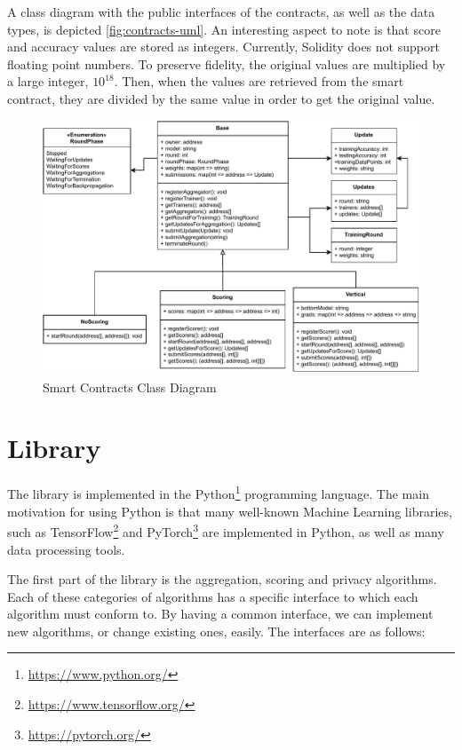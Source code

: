 A class diagram with the public interfaces of the contracts, as well as the data types, is depicted \autoref{fig:contracts-uml}. An interesting aspect to note is that score and accuracy values are stored as integers. Currently, Solidity does not support floating point numbers. To preserve fidelity, the original values are multiplied by a large integer, $10^{18}$. Then, when the values are retrieved from the smart contract, they are divided by the same value in order to get the original value.

\begin{figure}[!ht]
    \centering
    \centering
    \includegraphics[width=1\textwidth]{graphics/smart-contract-uml.pdf}
    \caption{Smart Contracts Class Diagram}
    \label{fig:contracts-uml}
\end{figure}

\section{Library}

The library is implemented in the Python\footnote{\url{https://www.python.org/}} programming language. The main motivation for using Python is that many well-known Machine Learning libraries, such as TensorFlow\footnote{\url{https://www.tensorflow.org/}} and PyTorch\footnote{\url{https://pytorch.org/}} are implemented in Python, as well as many data processing tools.

The first part of the library is the aggregation, scoring and privacy algorithms. Each of these categories of algorithms has a specific interface to which each algorithm must conform to. By having a common interface, we can implement new algorithms, or change existing ones, easily. The interfaces are as follows:

